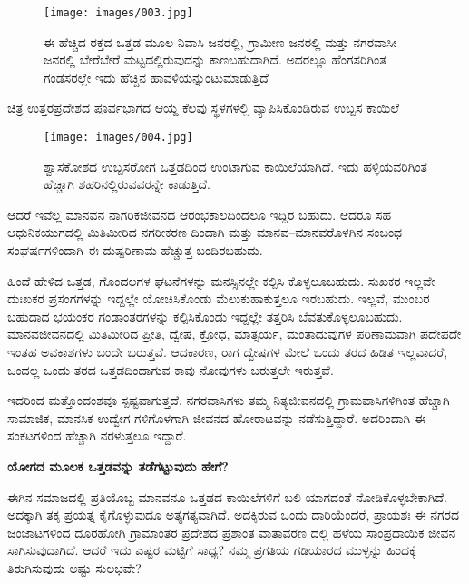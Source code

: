 \begin{figure}
\texttt{[image: images/003.jpg]}
\caption{ಈ ಹೆಚ್ಚಿದ ರಕ್ತದ ಒತ್ತಡ ಮೂಲ ನಿವಾಸಿ ಜನರಲ್ಲಿ, ಗ್ರಾಮೀಣ ಜನರಲ್ಲಿ ಮತ್ತು ನಗರವಾಸೀ ಜನರಲ್ಲಿ ಬೇರೆಬೇರೆ ಮಟ್ಟದಲ್ಲಿರುವುದನ್ನು ಕಾಣಬಹುದಾಗಿದೆ. ಅದರಲ್ಲೂ ಹೆಂಗಸರಿಗಿಂತ ಗಂಡಸರಲ್ಲೇ ಇದು ಹೆಚ್ಚಿನ ಹಾವಳಿಯನ್ನುಂಟುಮಾಡುತ್ತಿದೆ }
\end{figure}

\begin{center}
ಚಿತ್ರ  ಉತ್ತರಪ್ರದೇಶದ ಪೂರ್ವಭಾಗದ ಆಯ್ದ ಕೆಲವು ಸ್ಥಳಗಳಲ್ಲಿ ವ್ಯಾಪಿಸಿಕೊಂಡಿರುವ ಉಬ್ಬಸ ಕಾಯಿಲೆ
\end{center}

\begin{center}
\end{center}


\begin{figure}
\texttt{[image: images/004.jpg]}
\caption{ಶ್ವಾಸಕೋಶದ ಉಬ್ಬಸರೋಗ ಒತ್ತಡದಿಂದ ಉಂಟಾಗುವ ಕಾಯಿಲೆಯಾಗಿದೆ. ಇದು ಹಳ್ಳಿಯವರಿಗಿಂತ ಹೆಚ್ಚಾಗಿ ಶಹರಿನಲ್ಲಿರುವವರನ್ನೇ ಕಾಡುತ್ತಿದೆ.}
\end{figure}

ಆದರೆ ಇವೆಲ್ಲ ಮಾನವನ ನಾಗರಿಕಜೀವನದ ಆರಂಭಕಾಲದಿಂದಲೂ ಇದ್ದಿರ ಬಹುದು. ಆದರೂ ಸಹ ಆಧುನಿಕಯುಗದಲ್ಲಿ ಮಿತಿಮೀರಿದ ನಗರೀಕರಣ ದಿಂದಾಗಿ ಮತ್ತು ಮಾನವ–ಮಾನವರೊಳಗಿನ ಸಂಬಂಧ ಸಂಘರ್ಷಗಳಿಂದಾಗಿ ಈ ದುಷ್ಪರಿಣಾಮ ಹೆಚ್ಚುತ್ತ ಬಂದಿರಬಹುದು.

ಹಿಂದೆ ಹೇಳಿದ ಒತ್ತಡ, ಗೊಂದಲಗಳ ಘಟನೆಗಳನ್ನು ಮನಸ್ಸಿನಲ್ಲೇ ಕಲ್ಪಿಸಿ ಕೊಳ್ಳಲೂಬಹುದು. ಸುಖಕರ ಇಲ್ಲವೇ ದುಃಖಕರ ಪ್ರಸಂಗಗಳನ್ನು ಇದ್ದಲ್ಲೇ ಯೋಚಿಸಿಕೊಂಡು ಮೆಲುಕುಹಾಕುತ್ತಲೂ ಇರಬಹುದು. ಇಲ್ಲವೆ, ಮುಂಬರ ಬಹುದಾದ ಭಯಂಕರ ಗಂಡಾಂತರಗಳನ್ನು ಕಲ್ಪಿಸಿಕೊಂಡು ಇದ್ದಲ್ಲೇ ತತ್ತರಿಸಿ ಬೆವತುಕೊಳ್ಳಲೂಬಹುದು. ಮಾನವಜೀವನದಲ್ಲಿ ಮಿತಿಮೀರಿದ ಪ್ರೀತಿ, ದ್ವೇಷ, ಕ್ರೋಧ, ಮಾತ್ಸರ್ಯ, ಮಂತಾದುವುಗಳ ಪರಿಣಾಮವಾಗಿ ಪದೇಪದೇ ಇಂತಹ ಅವಕಾಶಗಳು ಬಂದೇ ಬರುತ್ತವೆ. ಆದಕಾರಣ, ರಾಗ ದ್ವೇಷಗಳ ಮೇಲೆ ಒಂದು ತರದ ಹಿಡಿತ ಇಲ್ಲವಾದರೆ, ಒಂದಲ್ಲ ಒಂದು ತರದ ಒತ್ತಡದಿಂದಾಗುವ ಕಾವು ನೋವುಗಳು ಬರುತ್ತಲೇ ಇರುತ್ತವೆ.

ಇದರಿಂದ ಮತ್ತೊಂದಂಶವೂ ಸ್ಪಷ್ಟವಾಗುತ್ತದೆ. ನಗರವಾಸಿಗಳು ತಮ್ಮ ನಿತ್ಯಜೀವನದಲ್ಲಿ ಗ್ರಾಮವಾಸಿಗಳಿಗಿಂತ ಹೆಚ್ಚಾಗಿ ಸಾಮಾಜಿಕ, ಮಾನಸಿಕ ಉದ್ವೇಗ ಗಳಿಗೊಳಗಾಗಿ ಜೀವನದ ಹೋರಾಟವನ್ನು ನಡೆಸುತ್ತಿದ್ದಾರೆ. ಅದರಿಂದಾಗಿ ಈ ಸಂಕಟಗಳಿಂದ ಹೆಚ್ಚಾಗಿ ನರಳುತ್ತಲೂ ಇದ್ದಾರೆ.

\textbf{ಯೋಗದ ಮೂಲಕ ಒತ್ತಡವನ್ನು ತಡೆಗಟ್ಟುವುದು ಹೇಗೆ?}

ಈಗಿನ ಸಮಾಜದಲ್ಲಿ ಪ್ರತಿಯೊಬ್ಬ ಮಾನವನೂ ಒತ್ತಡದ ಕಾಯಿಲೆಗಳಿಗೆ ಬಲಿ ಯಾಗದಂತೆ ನೋಡಿಕೊಳ್ಳಬೇಕಾಗಿದೆ. ಅದಕ್ಕಾಗಿ ತಕ್ಕ ಪ್ರಯತ್ನ ಕೈಗೊಳ್ಳುವುದೂ ಅತ್ಯಗತ್ಯವಾಗಿದೆ. ಅದಕ್ಕಿರುವ ಒಂದು ದಾರಿಯೆಂದರೆ, ಪ್ರಾಯಶಃ ಈ ನಗರದ ಜಂಜಾಟಗಳಿಂದ ದೂರಹೋಗಿ ಗ್ರಾಮಾಂತರ ಪ್ರದೇಶದ ಪ್ರಶಾಂತ ವಾತಾವರಣ ದಲ್ಲಿ ಹಳೆಯ ಸಾಂಪ್ರದಾಯಿಕ ಜೀವನ ಸಾಗಿಸುವುದಾಗಿದೆ. ಆದರೆ ಇದು ಎಷ್ಟರ ಮಟ್ಟಿಗೆ ಸಾಧ್ಯ? ನಮ್ಮ ಪ್ರಗತಿಯ ಗಡಿಯಾರದ ಮುಳ್ಳನ್ನು ಹಿಂದಕ್ಕೆ ತಿರುಗಿಸುವುದು ಅಷ್ಟು ಸುಲಭವೇ?


